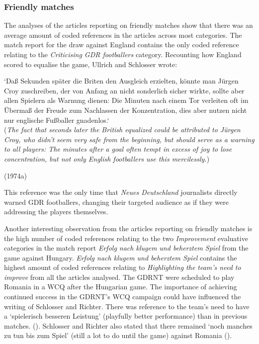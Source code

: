 \subsubsection*{Friendly matches}

The analyses of the articles reporting on friendly matches show that there was an average amount of coded references in the articles across most categories. The match report for the draw against England contains the only coded reference relating to the \textit{Criticising GDR footballers} category. Recounting how England scored to equalise the game, Ullrich and Schlosser wrote:

\begin{displayquote}
\begin{small}
‘Daß Sekunden später die Briten den Ausgleich erzielten, könnte man Jürgen Croy zuschreiben, der von Anfang an nicht sonderlich sicher wirkte, sollte aber allen Spielern als Warnung dienen: Die Minuten nach einem Tor verleiten oft im Übermaß der Freude zum Nachlassen der Konzentration, dies aber nutzen nicht nur englische Fußballer gnadenlos.‘\\
(\textit{The fact that seconds later the British equalized could be attributed to Jürgen Croy, who didn't seem very safe from the beginning, but should serve as a warning to all players: The minutes after a goal often tempt in excess of joy to lose concentration, but not only English footballers use this mercilessly.})\
\begin{flushright}\footnotesize (1974a)\end{flushright}
\end{small}
\end{displayquote}

This reference was the only time that \textit{Neues Deutschland} journalists directly warned GDR footballers, changing their targeted audience as if they were addressing the players themselves.

Another interesting observation from the articles reporting on friendly matches is the high number of coded references relating to the two \textit{Improvement} evaluative categories in the match report \textit{Erfolg nach klugem und beherztem Spiel} from the game against Hungary. \textit{Erfolg nach klugem und beherztem Spiel} contains the highest amount of coded references relating to \textit{Highlighting the team’s need to improve} from all the articles analysed. The GDRNT were scheduled to play Romania in a WCQ after the Hungarian game. The importance of achieving continued success in the GDRNT’s WCQ campaign could have influenced the writing of Schlosser and Richter. There was reference to the team’s need to have a ‘spielerisch besseren Leistung’ (playfully better performance) than in previous matches. (\cite{nd19730517}). Schlosser and Richter also stated that there remained ‘noch manches zu tun bis zum Spiel’ (still a lot to do until the game) against Romania (\cite{nd19730517}).

